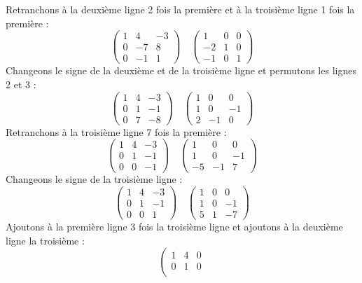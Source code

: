 {{	
	Retranchons à la deuxième ligne 2 fois la première et à la troisième ligne 1 fois la première :
	$$
	\left(\begin{array}{ccc}
		1 & 4 & -3 \\
		0 & -7 & 8 \\
		0 & -1 & 1
	\end{array}\right) \quad\left(\begin{array}{ccc}
		1 & 0 & 0 \\
		-2 & 1 & 0 \\
		-1 & 0 & 1
	\end{array}\right)
	$$
	Changeons le signe de la deuxième et de la troisième ligne et permutons les lignes 2 et 3 :
	$$
	\left(\begin{array}{ccc}
		1 & 4 & -3 \\
		0 & 1 & -1 \\
		0 & 7 & -8
	\end{array}\right) \quad\left(\begin{array}{ccc}
		1 & 0 & 0 \\
		1 & 0 & -1 \\
		2 & -1 & 0
	\end{array}\right)
	$$
	Retranchons à la troisième ligne 7 fois la première :
	$$
	\left(\begin{array}{ccc}
		1 & 4 & -3 \\
		0 & 1 & -1 \\
		0 & 0 & -1
	\end{array}\right) \quad\left(\begin{array}{ccc}
		1 & 0 & 0 \\
		1 & 0 & -1 \\
		-5 & -1 & 7
	\end{array}\right)
	$$
	Changeons le signe de la troisième ligne :
	$$
	\left(\begin{array}{ccc}
		1 & 4 & -3 \\
		0 & 1 & -1 \\
		0 & 0 & 1
	\end{array}\right) \quad\left(\begin{array}{ccc}
		1 & 0 & 0 \\
		1 & 0 & -1 \\
		5 & 1 & -7
	\end{array}\right)
	$$
	Ajoutons à la première ligne 3 fois la troisième ligne et ajoutons à la deuxième ligne la troisième :
	$$
	\left(\begin{array}{lll}
		1 & 4 & 0 \\
		0 & 1 & 0 \\

\end{array}$$}}
